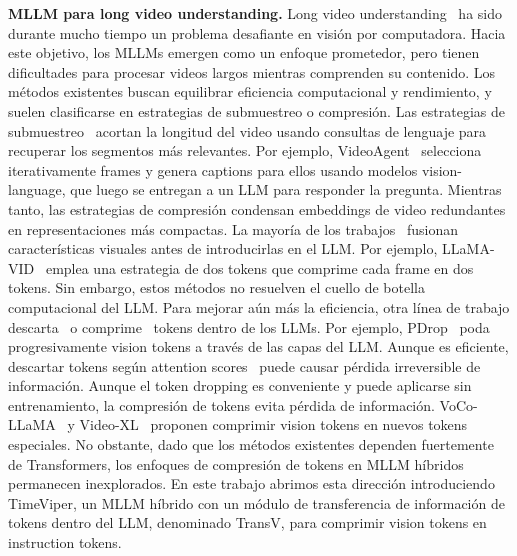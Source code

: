 \documentclass[10pt,twocolumn,letterpaper]{article}
\begin{document}
\noindent\textbf{MLLM para long video understanding.} 
Long video understanding~\cite{kahatapitiya2025langrepo,wang2024videoagent,zhang2024simpleLLM4video,mangalam2023egoschema,fu2025videomme,yue2023movie101} ha sido durante mucho tiempo un problema desafiante en visión por computadora.
Hacia este objetivo, los MLLMs emergen como un enfoque prometedor, pero tienen dificultades para procesar videos largos mientras comprenden su contenido.
Los métodos existentes buscan equilibrar eficiencia computacional y rendimiento, y suelen clasificarse en estrategias de submuestreo o compresión.
Las estrategias de submuestreo~\cite{pan2023retrieving,han2024self-retrieve,fan2024videoagent,yao2025gens,goletto2024amego,ye2025tstar} acortan la longitud del video usando consultas de lenguaje para recuperar los segmentos más relevantes.
Por ejemplo, VideoAgent~\cite{wang2024videoagent} selecciona iterativamente frames y genera captions para ellos usando modelos vision-language, que luego se entregan a un LLM para responder la pregunta.
Mientras tanto, las estrategias de compresión condensan embeddings de video redundantes en representaciones más compactas.
La mayoría de los trabajos~\cite{jin2024chatunivi,dai2023instructblip,islam2025bimba,shen2025longvu,li2024llamavid,chen2024internvl,liu2024nvila,xu2025auroralong,ren2024timechat,jiang2025storm,zohar2025apollo,li2025imove,yang2025visionzip} fusionan características visuales antes de introducirlas en el LLM.
Por ejemplo, LLaMA-VID~\cite{li2024llamavid} emplea una estrategia de dos tokens que comprime cada frame en dos tokens. 
Sin embargo, estos métodos no resuelven el cuello de botella computacional del LLM.
Para mejorar aún más la eficiencia, otra línea de trabajo descarta~\cite{xing2024pyramiddrop,chen2024fastv,li2024videochatflash} o comprime~\cite{zhang2024sparsevlm,ye2025vocollama,shu2025videoxl1,ren2025vamba,alayrac2022flamingo} tokens dentro de los LLMs.
Por ejemplo, PDrop~\cite{xing2024pyramiddrop} poda progresivamente vision tokens a través de las capas del LLM.
Aunque es eficiente, descartar tokens según attention scores~\cite{zou2025dont,alvar2025divprune} puede causar pérdida irreversible de información.
Aunque el token dropping es conveniente y puede aplicarse sin entrenamiento, la compresión de tokens evita pérdida de información.
VoCo-LLaMA~\cite{ye2025vocollama} y Video-XL~\cite{shu2025videoxl1} proponen comprimir vision tokens en nuevos tokens especiales.
No obstante, dado que los métodos existentes dependen fuertemente de Transformers, los enfoques de compresión de tokens en MLLM híbridos permanecen inexplorados.
En este trabajo abrimos esta dirección introduciendo TimeViper, un MLLM híbrido con un módulo de transferencia de información de tokens dentro del LLM, denominado TransV, para comprimir vision tokens en instruction tokens.
\end{document}
